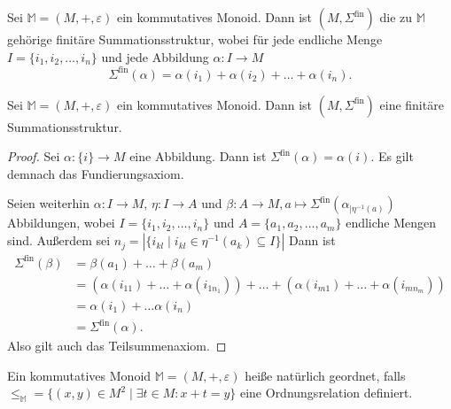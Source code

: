 \documentclass{article}
\begin{document}
\begin{definition}
  Sei $\mathbb{M} = (M, +, \varepsilon)$ ein  kommutatives Monoid.
  Dann ist $(M, \Sigma^\text{fin})$ die zu $\mathbb{M}$ gehörige finitäre Summationsstruktur,
  wobei für jede endliche Menge $I = \{i_1, i_2, \dots, i_n\}$
  und jede Abbildung $\alpha \colon I \to M$ 
  \begin{equation*}
    \Sigma^\text{fin}(\alpha) = \alpha(i_1) + \alpha(i_2) + \dots + \alpha(i_n).
  \end{equation*}
\end{definition}

\begin{theorem}
  Sei $\mathbb{M} = (M, +, \varepsilon)$ ein  kommutatives Monoid.
  Dann ist $(M, \Sigma^\text{fin})$ eine finitäre Summationsstruktur.
\end{theorem}
\begin{proof}
  Sei $\alpha \colon \{i\} \to M$ eine Abbildung.
  Dann ist $\Sigma^\text{fin}(\alpha) = \alpha(i)$.
  Es gilt demnach das Fundierungsaxiom.

  Seien weiterhin $\alpha \colon I \to M$,
  $\eta \colon I \to A$ und $\beta \colon A \to M, a \mapsto \Sigma^\text{fin}(\alpha_{\mid \eta^{-1}(a)})$
  Abbildungen, wobei $I = \{i_1, i_2, \dots, i_n\}$ und $A = \{a_1, a_2, \dots, a_m\}$ endliche Mengen sind.
  Außerdem sei $n_j = |\{ i_{kl} \mid i_{kl} \in \eta^{-1}(a_k) \subseteq I \}|$
  Dann ist 
  \begin{align*}
    \Sigma^\text{fin}(\beta)
    &= \beta(a_1) + \dots + \beta(a_m) \\
    &= (\alpha(i_{11}) + \dots + \alpha(i_{1n_1})) + \dots + (\alpha(i_{m1}) + \dots + \alpha(i_{mn_m})) \\
    &= \alpha(i_1) + \dots \alpha(i_n) \\
    &= \Sigma^\text{fin}(\alpha).
  \end{align*}
  Also gilt auch das Teilsummenaxiom.
\end{proof}

\begin{definition}
  Ein kommutatives Monoid $\mathbb{M} = (M, +, \varepsilon)$ heiße natürlich geordnet,
  falls $\leq_\mathbb{M} = \{ (x, y) \in M^2 \mid \exists t \in M \colon x + t = y \}$ eine Ordnungsrelation definiert.
\end{definition}
\end{document}
